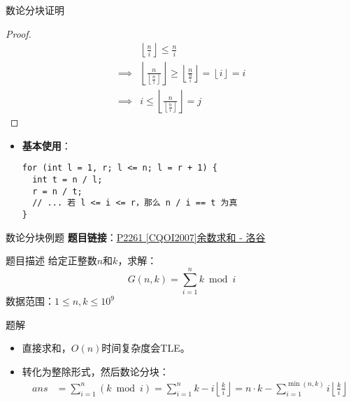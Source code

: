 \begin{frame}[fragile]{数论分块}{证明}
  \begin{proof} 
    $$
    \begin{aligned}
      &\left\lfloor\frac{n}{i}\right\rfloor \leq \frac{n}{i}\\
      \implies
      &\left\lfloor\frac{n}{ \left\lfloor\frac{n}{i}\right\rfloor }\right\rfloor
      \geq \left\lfloor\frac{n}{ \frac{n}{i} }\right\rfloor
      = \left\lfloor i \right\rfloor=i \\
      \implies
      &i\leq \left\lfloor\frac{n}{ \left\lfloor\frac{n}{i}\right\rfloor }\right\rfloor=j
    \end{aligned}
    $$
  \end{proof}
  
  \pause 
  \begin{itemize}
    \item \textbf{基本使用}：
    \begin{lstlisting}
for (int l = 1, r; l <= n; l = r + 1) {
  int t = n / l;
  r = n / t;
  // ... 若 l <= i <= r，那么 n / i == t 为真
}
    \end{lstlisting}
  \end{itemize}
\end{frame}

\begin{frame}[fragile]{数论分块}{例题}
  \textbf{题目链接}：\href{https://www.luogu.com.cn/problem/P2261}{P2261 [CQOI2007]余数求和 - 洛谷}
  \begin{block}{题目描述}
    给定正整数$n$和$k$，求解：
    $$
      G(n,k)=\sum\limits_{i=1}^n k \bmod{i}
    $$
    数据范围：$1\leq n, k\leq 10^9$
  \end{block}
  
  \pause
  \begin{exampleblock}{题解}
    \begin{itemize}
      \item 直接求和，$O(n)$时间复杂度会TLE。
      \pause
      \item 转化为整除形式，然后数论分块：
      $$
        \begin{aligned}
          ans &= \sum_{i=1}^n(k\bmod i) 
               = \sum_{i=1}^nk-i\left\lfloor\frac{k}{i}\right\rfloor 
               = n\cdot k - \sum_{i=1}^{\min(n,k)} i\left\lfloor\frac{k}{i}\right\rfloor
        \end{aligned}
      $$
    \end{itemize}
  \end{exampleblock}
\end{frame}

